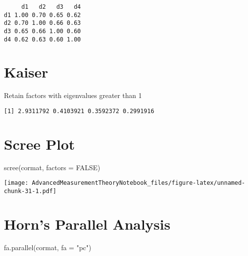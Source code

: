 \documentclass[
]{book}
\newenvironment{Shaded}{\begin{snugshade}}{\end{snugshade}}
\newcommand{\AttributeTok}[1]{\textcolor[rgb]{0.77,0.63,0.00}{#1}}
\newcommand{\ConstantTok}[1]{\textcolor[rgb]{0.00,0.00,0.00}{#1}}
\newcommand{\FunctionTok}[1]{\textcolor[rgb]{0.00,0.00,0.00}{#1}}
\newcommand{\NormalTok}[1]{#1}
\newcommand{\SpecialCharTok}[1]{\textcolor[rgb]{0.00,0.00,0.00}{#1}}
\newcommand{\StringTok}[1]{\textcolor[rgb]{0.31,0.60,0.02}{#1}}
\begin{document}
\begin{verbatim}
     d1   d2   d3   d4
d1 1.00 0.70 0.65 0.62
d2 0.70 1.00 0.66 0.63
d3 0.65 0.66 1.00 0.60
d4 0.62 0.63 0.60 1.00
\end{verbatim}

\hypertarget{kaiser}{%
\section{Kaiser}\label{kaiser}}

Retain factors with eigenvalues greater than 1

\begin{Shaded}
\end{Shaded}

\begin{verbatim}
[1] 2.9311792 0.4103921 0.3592372 0.2991916
\end{verbatim}

\hypertarget{scree-plot}{%
\section{Scree Plot}\label{scree-plot}}

\begin{Shaded}
\begin{Highlighting}[]
\FunctionTok{scree}\NormalTok{(cormat, }\AttributeTok{factors =} \ConstantTok{FALSE}\NormalTok{)}
\end{Highlighting}
\end{Shaded}

\texttt{[image: AdvancedMeasurementTheoryNotebook\_files/figure-latex/unnamed-chunk-31-1.pdf]}

\hypertarget{horns-parallel-analysis}{%
\section{Horn's Parallel Analysis}\label{horns-parallel-analysis}}

\begin{Shaded}
\begin{Highlighting}[]
\FunctionTok{fa.parallel}\NormalTok{(cormat, }\AttributeTok{fa =} \StringTok{"pc"}\NormalTok{)}
\end{Highlighting}
\end{Shaded}
\end{document}
